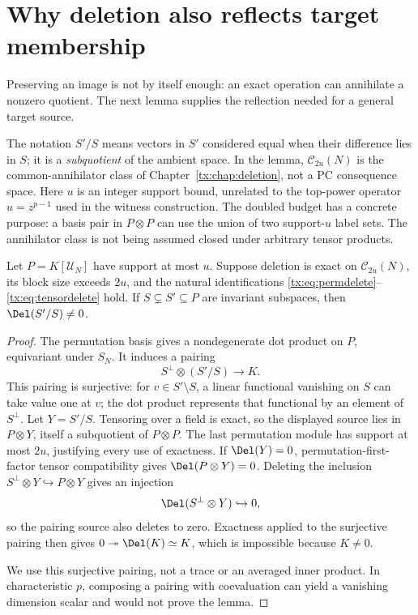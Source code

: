 \section{Why deletion also reflects target membership}
Preserving an image is not by itself enough: an exact operation can
annihilate a nonzero quotient. The next lemma supplies the reflection
needed for a general target source.

The notation $S'/S$ means vectors in $S'$ considered equal when their
difference lies in $S$; it is a \emph{subquotient} of the ambient space.
In the lemma, $\mathcal C_{2u}(N)$ is the common-annihilator class of
Chapter~\ref{tx:chap:deletion}, not a PC consequence space.
Here $u$ is an integer support bound, unrelated to the top-power
operator $u=z^{p-1}$ used in the witness construction.
The doubled budget has a concrete purpose: a basis pair in
$P\otimes P$ can use the union of two support-$u$ label sets.
The annihilator class is not being assumed closed under arbitrary
tensor products.

\begin{lemma}\label{tx:lem:detect}
Let $P=K[\mathcal U_N]$ have support at most $u$. Suppose deletion is
exact on $\mathcal C_{2u}(N)$, its block size exceeds $2u$, and the
natural identifications \eqref{tx:eq:permdelete}--\eqref{tx:eq:tensordelete}
hold. If $S\subsetneq S'\subseteq P$ are invariant subspaces, then
$\Del(S'/S)\ne0$.
\end{lemma}
\begin{proof}
The permutation basis gives a nondegenerate dot product on $P$,
equivariant under $S_N$. It induces a pairing
\[
                         S^\perp\otimes(S'/S)\longrightarrow K.
\]
This pairing is surjective: for $v\in S'\setminus S$, a linear
functional vanishing on $S$ can take value one at $v$; the dot product
represents that functional by an element of $S^\perp$.
Let $Y=S'/S$. Tensoring over a field is exact, so the displayed
source lies in $P\otimes Y$, itself a subquotient of $P\otimes P$.
The last permutation module has support at most $2u$, justifying
every use of exactness. If $\Del(Y)=0$, permutation-first-factor tensor
compatibility gives $\Del(P\otimes Y)=0$. Deleting the inclusion
$S^\perp\otimes Y\hookrightarrow P\otimes Y$ gives an injection
\[
                  \Del(S^\perp\otimes Y)\hookrightarrow0,
\]
so the pairing source also deletes to zero. Exactness applied to the
surjective pairing then gives $0\twoheadrightarrow\Del(K)\simeq K$,
which is impossible because $K\ne0$.

We use this surjective pairing, not a trace or an averaged inner
product. In characteristic $p$, composing a pairing with coevaluation
can yield a vanishing dimension scalar and would not prove the lemma.
\end{proof}

